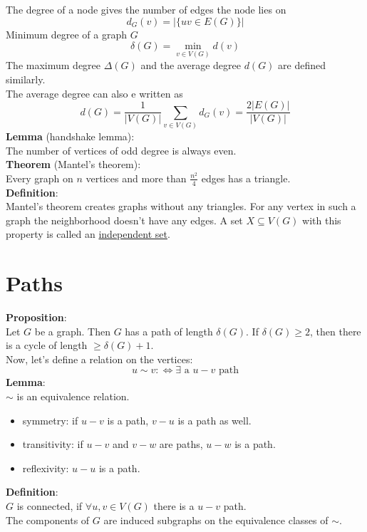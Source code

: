 \documentclass[a4paper, 12pt]{article}
\begin{document}
	The degree of a node gives the number of edges the node lies on \[d_G(v) = \left|\{uv \in E(G)\}\right|\]
	Minimum degree of a graph $G$ \[\delta(G) = \min_{v \in V(G)} d(v)\]
	The maximum degree $\Delta(G)$ and the average degree $d(G)$ are defined similarly.\\
	The average degree can also e written as \[d(G) = \frac{1}{\left|V(G)\right|} \sum_{v \in V(G)} d_G(v) = \frac{2\left|E(G)\right|}{\left|V(G)\right|}\]
	\textbf{Lemma} (handshake lemma):\\
	The number of vertices of odd degree is always even.\\
	\textbf{Theorem} (Mantel's theorem):\\
	Every graph on $n$ vertices and more than $\frac{n^2}{4}$ edges has a triangle.\\
	\textbf{Definition}:\\
	Mantel's theorem creates graphs without any triangles. For any vertex in such a graph the neighborhood doesn't have any edges. A set $X \subseteq V(G)$ with this property is called an \underline{independent set}. \\
	\section{Paths}
	\textbf{Proposition}:\\
	Let $G$ be a graph. Then $G$ has a path of length $\delta(G)$. If $\delta(G) \geq 2$, then there is a cycle of length $\geq \delta(G)+1$.\\
	
	Now, let's define a relation on the vertices: \[u\sim v :\Leftrightarrow \exists \text{ a $u-v$ path}\]
	\textbf{Lemma}:\\
	$\sim$ is an equivalence relation.
	\begin{itemize}
		\item symmetry: if $u-v$ is a path, $v-u$ is a path as well.
		\item transitivity: if $u-v$ and $v-w$ are paths, $u-w$ is a path.
		\item reflexivity: $u-u$ is a path.
	\end{itemize}
	\textbf{Definition}:\\
	$G$ is connected, if $\forall u,v \in V(G)$ there is a $u-v$ path.\\
	The components of $G$ are induced subgraphs on the equivalence classes of $\sim$.
\end{document}
